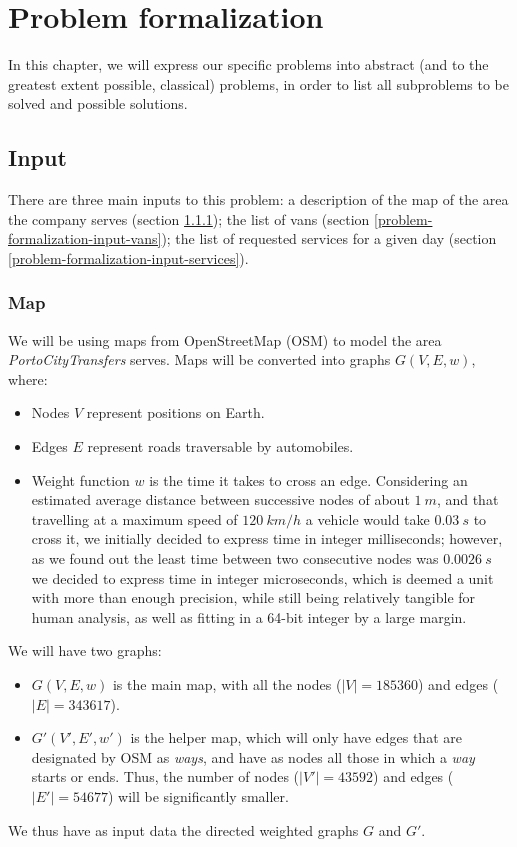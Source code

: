 \chapter{Problem formalization} \label{problem-formalization}
In this chapter, we will express our specific problems into abstract (and to the greatest extent possible, classical) problems, in order to list all subproblems to be solved and possible solutions.
\section{Input} \label{problem-formalization-input}
There are three main inputs to this problem: a description of the map of the area the company serves (section \ref{problem-formalization-input-map}); the list of vans (section \ref{problem-formalization-input-vans}); the list of requested services for a given day (section \ref{problem-formalization-input-services}).
\subsection{Map} \label{problem-formalization-input-map}
We will be using maps from OpenStreetMap (OSM) to model the area \emph{PortoCityTransfers} serves.
Maps will be converted into graphs $G(V,E, w)$, where:
\begin{itemize}
    \item Nodes $V$ represent positions on Earth.
    \item Edges $E$ represent roads traversable by automobiles.
    \item Weight function $w$ is the time it takes to cross an edge. Considering an estimated average distance between successive nodes of about $\SI{1}{m}$, and that travelling at a maximum speed of $\SI{120}{km/h}$ a vehicle would take $\SI{0.03}{s}$ to cross it, we initially decided to express time in integer milliseconds; however, as we found out the least time between two consecutive nodes was $\SI{0.0026}{s}$ we decided to express time in integer microseconds, which is deemed a unit with more than enough precision, while still being relatively tangible for human analysis, as well as fitting in a 64-bit integer by a large margin.
\end{itemize}
We will have two graphs:
\begin{itemize}
    \item $G(V,E,w)$ is the main map, with all the nodes ($|V|=185360$) and edges ($|E|=343617$).
    \item $G'(V',E',w')$ is the helper map, which will only have edges that are designated by OSM as \emph{ways}, and have as nodes all those in which a \emph{way} starts or ends. Thus, the number of nodes ($|V'|=43592$) and edges ($|E'|=54677$) will be significantly smaller.
\end{itemize}
We thus have as input data the directed weighted graphs $G$ and $G'$.
